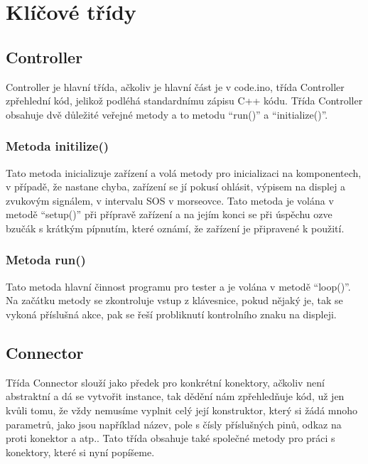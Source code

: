 
\section{Klíčové třídy}
\subsection{Controller}
Controller je hlavní třída, ačkoliv je hlavní část je v code.ino, třída Controller zpřehlední kód, jelikož podléhá standardnímu zápisu C++ kódu. Třída Controller obsahuje dvě důležité veřejné metody a to metodu “run()” a “initialize()”.

\subsubsection{Metoda initilize()}
Tato metoda inicializuje zařízení a volá metody pro inicializaci na komponentech, v případě, že nastane chyba, zařízení se jí pokusí ohlásit, výpisem na displej a zvukovým signálem, v intervalu SOS v morseovce. Tato metoda je volána v metodě “setup()” při přípravě zařízení a na jejím konci se při úspěchu ozve bzučák s krátkým pípnutím, které oznámí, že zařízení je připravené k použití.

\subsubsection{Metoda run()}
Tato metoda hlavní činnost programu pro tester a je volána v metodě “loop()”. Na začátku metody se zkontroluje vstup z klávesnice, pokud nějaký je, tak se vykoná příslušná akce, pak se řeší probliknutí kontrolního znaku na displeji.

\subsection{Connector}
Třída Connector slouží jako předek pro konkrétní konektory, ačkoliv není abstraktní a dá se vytvořit instance, tak dědění nám zpřehledňuje kód, už jen kvůli tomu, že vždy nemusíme vyplnit celý její konstruktor, který si žádá mnoho parametrů, jako jsou například název, pole s čísly příslušných pinů, odkaz na proti konektor a atp.. Tato třída obsahuje také společné metody pro práci s konektory, které si nyní popíšeme.

